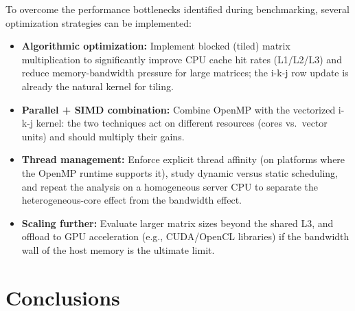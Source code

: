 \documentclass[12pt,a4paper]{article}
\begin{document}
To overcome the performance bottlenecks identified during benchmarking,
several optimization strategies can be implemented:
\begin{itemize}
\item \textbf{Algorithmic optimization:} Implement blocked (tiled) matrix
multiplication to significantly improve CPU cache hit rates (L1/L2/L3) and
reduce memory-bandwidth pressure for large matrices; the i-k-j row update is
already the natural kernel for tiling.
\item \textbf{Parallel + SIMD combination:} Combine OpenMP with the
vectorized i-k-j kernel: the two techniques act on different resources
(cores vs.\ vector units) and should multiply their gains.
\item \textbf{Thread management:} Enforce explicit thread affinity (on
platforms where the OpenMP runtime supports it), study dynamic versus static
scheduling, and repeat the analysis on a homogeneous server CPU to separate
the heterogeneous-core effect from the bandwidth effect.
\item \textbf{Scaling further:} Evaluate larger matrix sizes beyond the
shared L3, and offload to GPU acceleration (e.g., CUDA/OpenCL libraries) if
the bandwidth wall of the host memory is the ultimate limit.
\end{itemize}

\section{Conclusions}
\label{sec:concl}
\end{document}

